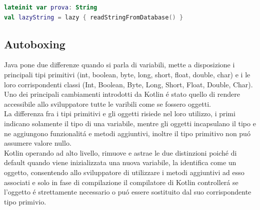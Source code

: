 \begin{lstlisting}[language=Kotlin,caption={Late init}]
lateinit var prova: String
val lazyString = lazy { readStringFromDatabase() }
\end{lstlisting}


\subsection{Autoboxing}


Java pone due differenze quando si parla di variabili, mette a disposizione i principali tipi primitivi (int, boolean, byte, long, short, float, double, char) e i le loro corrispondenti classi (Int, Boolean, Byte, Long, Short, Float, Double, Char).\\
Uno dei principali cambiamenti introdotti da Kotlin \'e stato quello di rendere accessibile allo sviluppatore tutte le varibili come se fossero oggetti.\\
La differenza fra i tipi primitivi e gli oggetti risiede nel loro utilizzo, i primi indicano solamente il tipo di una variabile, mentre gli oggetti incapsulano il tipo e ne aggiungono funzionalit\'a e metodi aggiuntivi, inoltre il tipo primitivo non pu\'o assumere valore nullo. \\
Kotlin operando ad alto livello, rimuove e astrae le due distinzioni poich\'e di default quando viene inizializzata una nuova variabile, la identifica come un oggetto, consentendo allo sviluppatore di utilizzare i metodi aggiuntivi ad esso associati e solo in fase di compilazione il compilatore di Kotlin controller\'a se l'oggetto \'e strettamente necessario o pu\'o essere sostituito dal suo corrispondente tipo primivio.

